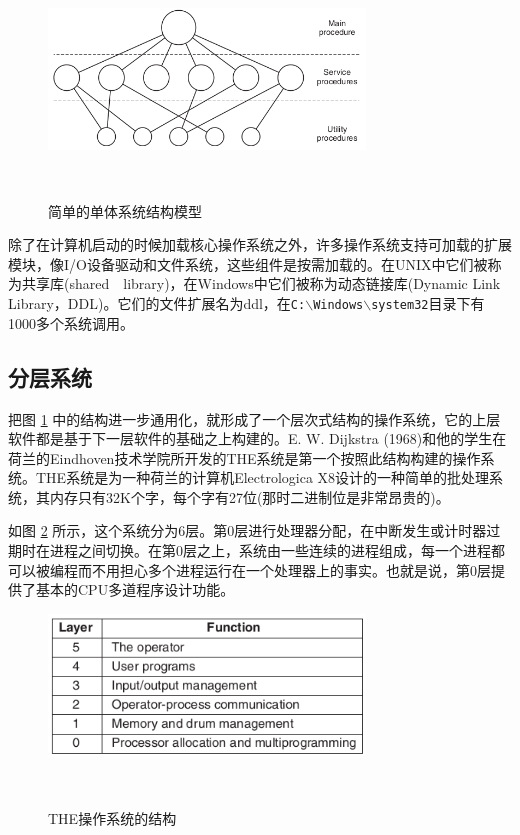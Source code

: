    \begin{figure}[ht]\small
	   \centering
	   \includegraphics[width=0.75\textwidth]{FIG/1-24.png}
	   \caption{简单的单体系统结构模型}　\label{fig:monolithic}
   \end{figure}
   	
   除了在计算机启动的时候加载核心操作系统之外，许多操作系统支持可加载的扩展模块，像I/O设备驱动和文件系统，这些组件是按需加载的。在UNIX中它们被称为共享库(shared　library)，在Windows中它们被称为动态链接库(Dynamic Link Library，DDL)。它们的文件扩展名为ddl，在\texttt{C:$\backslash$Windows$\backslash$system32}目录下有1000多个系统调用。
   
   \subsection{分层系统}
   
   把图 \ref{fig:monolithic} 中的结构进一步通用化，就形成了一个层次式结构的操作系统，它的上层软件都是基于下一层软件的基础之上构建的。E. W. Dijkstra (1968)和他的学生在荷兰的Eindhoven技术学院所开发的THE系统是第一个按照此结构构建的操作系统。THE系统是为一种荷兰的计算机Electrologica X8设计的一种简单的批处理系统，其内存只有32K个字，每个字有27位(那时二进制位是非常昂贵的)。
   
   如图 \ref{fig:layered} 所示，这个系统分为6层。第0层进行处理器分配，在中断发生或计时器过期时在进程之间切换。在第0层之上，系统由一些连续的进程组成，每一个进程都可以被编程而不用担心多个进程运行在一个处理器上的事实。也就是说，第0层提供了基本的CPU多道程序设计功能。
	
   \begin{figure}[ht]\small
		\centering
		\includegraphics[width=0.75\textwidth]{FIG/1-25.png}
		\caption{THE操作系统的结构}　\label{fig:layered}
   \end{figure}

